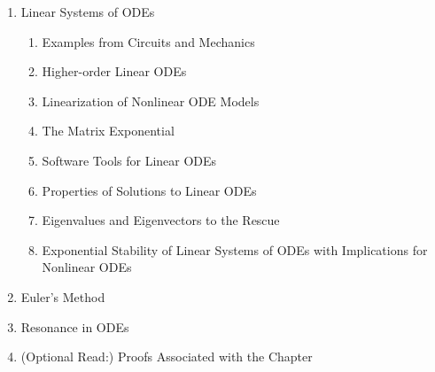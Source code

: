 \begin{enumerate}
  \item Linear Systems of ODEs 
  \begin{enumerate}
  \item Examples from Circuits and Mechanics 
  \item Higher-order Linear ODEs 
  \item Linearization of Nonlinear ODE Models 
  \item The Matrix Exponential 
  \item Software Tools for Linear ODEs
  \item Properties of Solutions to Linear ODEs
  \item Eigenvalues and Eigenvectors to the Rescue 
  \item Exponential Stability of Linear Systems of ODEs with Implications for Nonlinear ODEs
  \end{enumerate}
  \item Euler’s Method
  \item Resonance in ODEs
  \item (Optional Read:) Proofs Associated with the Chapter
\end{enumerate}

